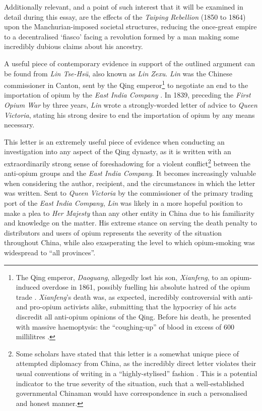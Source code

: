 \documentclass[a4paper,oneside]{article}
\begin{document}
Additionally relevant, and a point of such interest that it will be examined in
detail during this essay, are the effects of the \textit{Taiping Rebellion}
(1850 to 1864) upon the Manchurian-imposed societal structures, reducing the
once-great empire to a decentralised `fiasco' facing a revolution formed by a
man making some incredibly dubious claims about his ancestry.

A useful piece of contemporary evidence in support of the outlined argument can
be found from \textit{Lin Tse-Hs\"u}, also known as \textit{Lin Zexu}.
\textit{Lin} was the Chinese commissioner in Canton, sent by the Qing
emperor\footnote{The Qing emperor, \textit{Daoguang}, allegedly lost his son,
\textit{Xianfeng}, to an opium-induced overdose in 1861, possibly fuelling his
absolute hatred of the opium trade \autocite{Ringmar:2013}. \textit{Xianfeng}'s
death was, as expected, incredibly controversial with anti- and pro-opium
activists alike, submitting that the hypocrisy of his acts discredit all
anti-opium opinions of the Qing. Before his death, he presented with massive
haemoptysis: the ``coughing-up'' of blood in excess of 600 millilitres
\autocite{Sabatine:2013}.} to negotiate an end to the importation of opium by
the \textit{East India Company} \autocite{ChinaHistoricalArchives:1992}. In
1839, preceding the \textit{First Opium War} by three years, \textit{Lin} wrote
a strongly-worded letter of advice to \textit{Queen Victoria}, stating his
strong desire to end the importation of opium by any means necessary.


This letter is an extremely useful piece of evidence when conducting an
investigation into any aspect of the Qing dynasty, as it is written with an
extraordinarily strong sense of foreshadowing for a violent
conflict\footnote{Some scholars have stated that this letter is a somewhat
unique piece of attempted diplomacy from China, as the incredibly direct letter
violates their usual conventions of writing in a ``highly-stylised'' fashion
\autocite{Kishlansky:1995}. This is a potential indicator to the true severity
of the situation, such that a well-established governmental Chinaman would have
correspondence in such a personalised and honest manner.} between the anti-opium
groups and the \textit{East India Company}. It becomes increasingly valuable
when considering the author, recipient, and the circumstances in which the
letter was written. Sent to \textit{Queen Victoria} by the commissioner of the
primary trading port of the \textit{East India Company}, \textit{Lin} was likely
in a more hopeful position to make a plea to \textit{Her Majesty} than any other
entity in China due to his familiarity and knowledge on the matter. His extreme
stance on serving the death penalty to distributors and users of opium
represents the severity of the situation throughout China, while also
exasperating the level to which opium-smoking was widespread to ``all
provinces''.
\end{document}
